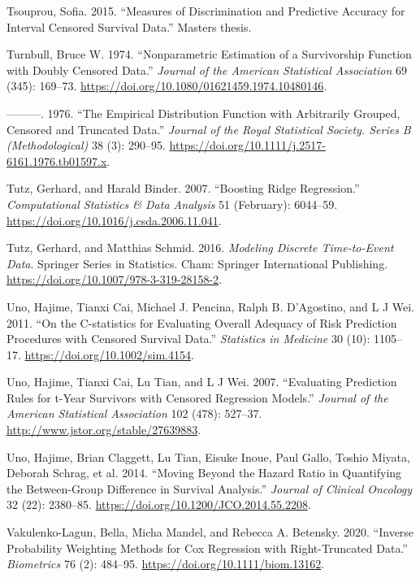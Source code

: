\documentclass[
  letterpaper,
  krantz2]{style/krantz}
\newlength{\cslhangindent}
\newenvironment{CSLReferences}[2] %
 {\begin{list}{}{%
  \setlength{\itemindent}{0pt}
  \setlength{\leftmargin}{0pt}
  \setlength{\parsep}{0pt}
  \ifodd #1
   \setlength{\leftmargin}{\cslhangindent}
   \setlength{\itemindent}{-1\cslhangindent}
  \fi
  \setlength{\itemsep}{#2\baselineskip}}}
 {\end{list}}
\begin{document}
\begin{CSLReferences}{1}{0}
Tsouprou, Sofia. 2015. {``Measures of Discrimination and Predictive
Accuracy for Interval Censored Survival Data.''}
Master\textquotesingle s thesis.

Turnbull, Bruce W. 1974. {``Nonparametric Estimation of a Survivorship
Function with Doubly Censored Data.''} \emph{Journal of the American
Statistical Association} 69 (345): 169--73.
\url{https://doi.org/10.1080/01621459.1974.10480146}.

---------. 1976. {``The Empirical Distribution Function with Arbitrarily
Grouped, Censored and Truncated Data.''} \emph{Journal of the Royal
Statistical Society. Series B (Methodological)} 38 (3): 290--95.
\url{https://doi.org/10.1111/j.2517-6161.1976.tb01597.x}.

Tutz, Gerhard, and Harald Binder. 2007. {``{Boosting Ridge
Regression}.''} \emph{Computational Statistics \& Data Analysis} 51
(February): 6044--59. \url{https://doi.org/10.1016/j.csda.2006.11.041}.

Tutz, Gerhard, and Matthias Schmid. 2016. \emph{{Modeling Discrete
Time-to-Event Data}}. Springer Series in Statistics. Cham: Springer
International Publishing.
\url{https://doi.org/10.1007/978-3-319-28158-2}.

Uno, Hajime, Tianxi Cai, Michael J. Pencina, Ralph B. D'Agostino, and L
J Wei. 2011. {``{On the C-statistics for Evaluating Overall Adequacy of
Risk Prediction Procedures with Censored Survival Data}.''}
\emph{Statistics in Medicine} 30 (10): 1105--17.
\url{https://doi.org/10.1002/sim.4154}.

Uno, Hajime, Tianxi Cai, Lu Tian, and L J Wei. 2007. {``{Evaluating
Prediction Rules for t-Year Survivors with Censored Regression
Models}.''} \emph{Journal of the American Statistical Association} 102
(478): 527--37. \url{http://www.jstor.org/stable/27639883}.

Uno, Hajime, Brian Claggett, Lu Tian, Eisuke Inoue, Paul Gallo, Toshio
Miyata, Deborah Schrag, et al. 2014. {``Moving Beyond the Hazard Ratio
in Quantifying the Between-Group Difference in Survival Analysis.''}
\emph{Journal of Clinical Oncology} 32 (22): 2380--85.
\url{https://doi.org/10.1200/JCO.2014.55.2208}.

Vakulenko-Lagun, Bella, Micha Mandel, and Rebecca A. Betensky. 2020.
{``Inverse {Probability Weighting Methods} for {Cox Regression} with
{Right-Truncated Data}.''} \emph{Biometrics} 76 (2): 484--95.
\url{https://doi.org/10.1111/biom.13162}.


\end{CSLReferences}
\end{document}

